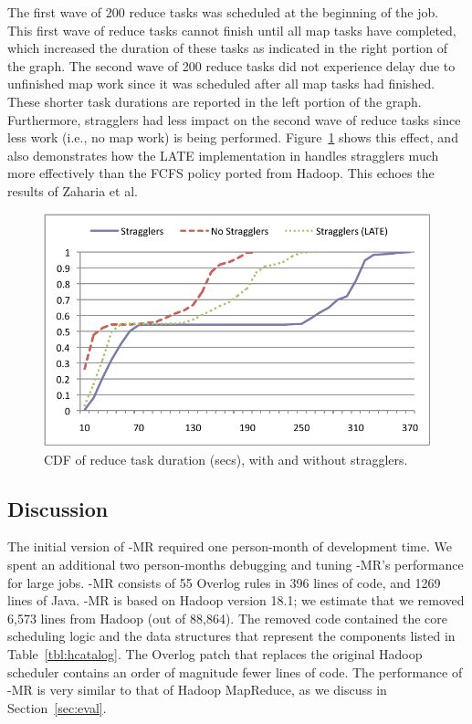 The first wave of 200 reduce tasks was scheduled at the beginning of the
job. This first wave of reduce tasks cannot finish until all map tasks have
completed, which increased the duration of these tasks as indicated in the right
portion of the graph. The second wave of 200 reduce tasks did not experience
delay due to unfinished map work since it was scheduled after all map tasks had
finished. These shorter task durations are reported in the left portion of the
graph. Furthermore, stragglers had less impact on the second wave of reduce
tasks since less work (i.e., no map work) is being
performed. Figure~\ref{fig:ec2reduce} shows this effect, and also demonstrates
how the LATE implementation in {\BOOMA} handles stragglers much more effectively
than the FCFS policy ported from Hadoop.  This echoes the results of Zaharia et
al.~\cite{late-sched}

\begin{figure}[t]
  \centering
  \includegraphics[width=0.95\linewidth]{graphs/reduce_stragglers}
  \caption{CDF of reduce task duration (secs), with and without stragglers.}
  \label{fig:ec2reduce}
  \vspace{-8pt}
\end{figure}

\subsection{Discussion}
The initial version of \BOOM-MR required one person-month of
development time. We spent an additional two person-months debugging
and tuning \BOOM-MR's performance for large jobs. \BOOM-MR consists of
55 Overlog rules in 396 lines of code, and 1269 lines of Java.
\BOOM-MR is based on Hadoop version 18.1; we estimate that we removed
6,573 lines from Hadoop (out of 88,864). The removed code contained
the core scheduling logic and the data structures that represent the
components listed in Table~\ref{tbl:hcatalog}. The Overlog patch that
replaces the original Hadoop scheduler contains an order of magnitude
fewer lines of code.  The performance of \BOOM-MR is very similar to
that of Hadoop MapReduce, as we discuss in Section~\ref{sec:eval}.

